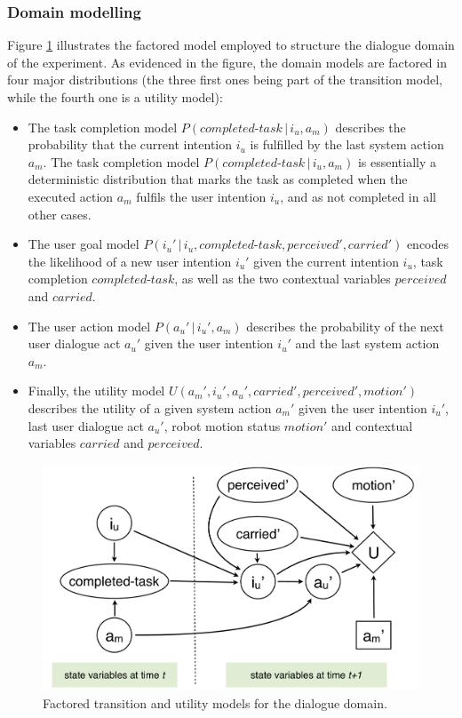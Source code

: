 \subsubsection*{Domain modelling}

Figure \ref{fig:unstructuredmodel-exp3} illustrates the factored model employed to structure the dialogue domain of the experiment.  As evidenced in the figure, the domain models are factored in four major distributions (the three first ones being part of the transition model, while the fourth one is a utility model): 
\begin{itemize}
\item The task completion model $P(\mathit{completed\mbox{-}task}\, | \, i_u, a_m)$ describes the probability that the current intention $i_u$ is fulfilled by the last system action $a_m$.  The task completion model $P(\mathit{completed\mbox{-}task}\, | \, i_u, a_m)$ is essentially a deterministic distribution that marks the task as completed when the executed action $a_m$ fulfils the user intention $i_u$,  and as not completed in all other cases. %
\item The user goal model $P(i_u' \, | \, i_u, \mathit{completed\mbox{-}task}, \mathit{perceived'}, \mathit{carried'})$ encodes the likelihood of a new user intention $i_u'$ given the current intention $i_u$, task completion $\mathit{completed\mbox{-}task}$, as well as the two contextual variables $\mathit{perceived}$ and $\mathit{carried}$. 
\item The user action model $P(a_u'\, | \, i_u', a_m)$ describes the probability of the next user dialogue act $a_u'$ given the user intention $i_u'$ and the last system action $a_m$.
\item Finally, the utility model $U(a_m', i_u', a_u', \mathit{carried'}, \mathit{perceived'}, \mathit{motion'})$ describes the utility of a given system action $a_m'$ given the user intention $i_u'$, last user dialogue act $a_u'$, robot motion status $\mathit{motion'}$ and contextual variables $\mathit{carried}$ and $\mathit{perceived}$. 
\end{itemize}

\begin{figure}[h]
\centering
\includegraphics[scale=0.4]{imgs/unstructuredmodel.pdf} 
\caption{Factored transition and utility models for the dialogue domain.}
\label{fig:unstructuredmodel-exp3}
\end{figure}

